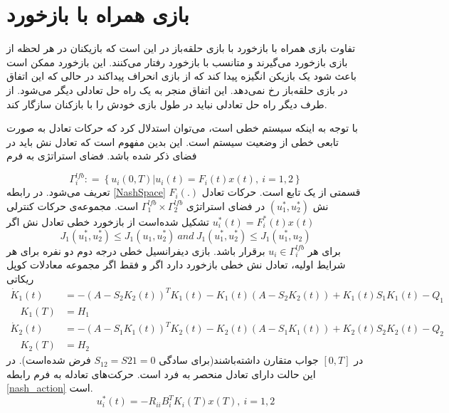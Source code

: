 \section{بازی همراه با بازخورد}
تفاوت بازی همراه با بازخورد  با بازی حلقه‌باز در این است که بازیکنان در هر لحظه از بازی بازخورد می‌گیرند و متانسب با بازخورد رفتار می‌کنند. این بازخورد ممکن است باعث شود یک بازیکن انگیزه پیدا کند که از بازی انحراف پیداکند در حالی که این اتفاق در بازی حلقه‌باز رخ نمی‌دهد. این اتفاق منجر به یک راه حل تعادلی دیگر می‌شود. از طرف دیگر راه حل تعادلی نباید در طول بازی خودش را با بازکنان سازگار کند.


با توجه به اینکه سیستم خطی است، می‌توان استدلال کرد که حرکات تعادل به صورت تابعی خطی از وضعیت سیستم است. این بدین مفهوم است که تعادل نش باید در فضای ذکر شده باشد. فضای استراتژی به فرم 

\begin{equation}\label{NashSpace}
	\Gamma^{lfb}_i :‌= \left\{u_i(0, T)\vert u_i(t) = F_i(t)x(t) ,~ i = 1, 2\right\}
\end{equation}
تعریف می‌شود. در رابطه
 \ref{NashSpace}
$F_i(.)$
قسمتی از یک تابع است. حرکات تعادل نش
$(u_1^*, u_2^*)$
در فضای استراتژی 
$\Gamma^{lfb}_1\times\Gamma^{lfb}_2$
است.
مجموعه‌ی حرکات کنترلی 
$u_i^*(t)=F_i^*(t)x(t)$
تشکیل شده‌است از بازخورد خطی تعادل نش اگر
\begin{equation*}
	J_1(u_1^*, u_2^*)\leq J_1(u_1, u_2^*)~ and~
	J_1(u_1^*, u_2^*)\leq J_1(u_1^*, u_2)
\end{equation*}
برای هر 
$u_i\in \Gamma^{lfb}_i$
برقرار باشد.
بازی دیفرانسیل خطی درجه دوم دو نفره برای هر شرایط اولیه، تعادل نش خطی بازخورد دارد اگر و فقط اگر مجموعه معادلات کوپل ریکاتی
\begin{align}
	\dot{K}_1(t) &= -(A-S_2K_2(t))^TK_1(t)-K_1(t)(A-S_2K_2(t))+
	K_1(t)S_1K_1(t)-Q_1\\
	 \quad K_1(T) &= H_1\nonumber\\
	\dot{K}_2(t) &= -(A-S_1K_1(t))^TK_2(t)-K_2(t)(A-S_1K_1(t))+
	K_2(t)S_2K_2(t)-Q_2\\
	 \quad K_2(T) &= H_2 \nonumber
\end{align}
در 
$[0, T]$
جواب متقارن داشته‌باشند(برای سادگی 
$S_{12}=S{21} =0 $
فرض شده‌است).
در این حالت دارای تعادل منحصر به فرد است. حرکت‌های تعادله به فرم رابطه
\ref{nash_action}
است.
\begin{equation}\label{nash_action}
	u_i^*(t) = -R_{ii}B_i^TK_i(T)x(T),~i = 1, 2
\end{equation}
